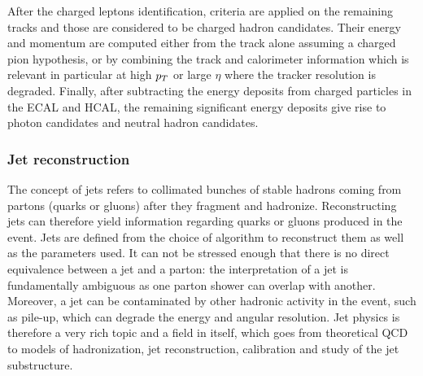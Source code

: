     After the charged leptons identification, criteria are applied on the remaining
    tracks and those are considered to be charged hadron candidates. Their energy
    and momentum are computed either from the track alone assuming a charged pion
    hypothesis, or by combining the track and calorimeter information which is relevant
    in particular at high $p_T$ or large $\eta$ where the tracker resolution is
    degraded. Finally, after subtracting the energy deposits from charged particles
    in the ECAL and HCAL, the remaining significant energy deposits give rise to photon
    candidates and neutral hadron candidates.

    \subsubsection{Jet reconstruction \label{sec:jetReconstruction}}

    The concept of jets refers to collimated bunches of stable hadrons coming from partons
    (quarks or gluons) after they fragment and hadronize. Reconstructing jets can
    therefore yield information regarding quarks or gluons produced in the event.
    Jets are defined from the choice of algorithm to reconstruct them as well as the
    parameters used. It can not be stressed enough that there is no direct equivalence
    between a jet and a parton: the interpretation of a jet is fundamentally ambiguous
    as one parton shower can overlap with another. Moreover, a jet can be contaminated by other
    hadronic activity in the event, such as pile-up, which can degrade the energy
    and angular resolution. Jet physics is therefore a very rich topic and a field
    in itself, which goes from theoretical QCD to models of hadronization, jet
    reconstruction, calibration and study of the jet substructure.

